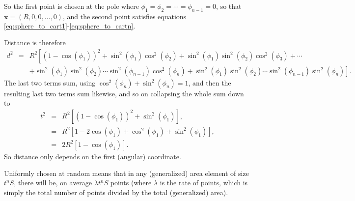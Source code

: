 So the first point is chosen at the pole where
$\phi_1=\phi_2=\cdots=\phi_{n-1}=0$, so that ${\mathbf x} =
(R,0,0,\ldots,0)$, and the second point satisfies equations
\eqref{eq:sphere_to_cart1}-\eqref{eq:sphere_to_cartn}. 

Distance is therefore
\begin{eqnarray}
  \label{eq:d_nsphere}
  d^2 & = & R^2 \left[ 
                        (1-\cos(\phi_1))^2
                       + \sin^2 (\phi_1) \cos^2 (\phi_2 )
                       + \sin^2 (\phi_1) \sin^2 (\phi_2) \cos^2 (\phi_3 )
                       + \cdots \right.  \nonumber \\
     & &   \left.           + \sin^2 (\phi_1) \sin^2 (\phi_2) \cdots \sin^2 (\phi_{n-1}) \cos^2 (\phi_{n})
                       + \sin^2 (\phi_1) \sin^2 (\phi_2) \cdots \sin^2 (\phi_{n-1}) \sin^2 (\phi_{n}) 
                 \right].
\end{eqnarray}
The last two terms sum, using $\cos^2 (\phi_{n}) + \sin^2
(\phi_{n}) = 1$, and then the resulting last two terms sum
likewise, and so on collapsing the whole sum down to
\begin{eqnarray}
  \label{eq:d_nsphere}
  t^2 & = & R^2 \left[ 
                        (1-\cos(\phi_1))^2
                       + \sin^2 (\phi_1) \right], \nonumber \\
 & = & R^2 \left[ 1 - 2 \cos(\phi_1) + \cos^2(\phi_1)
                       + \sin^2 (\phi_1) \right], \nonumber \\
 & = & 2 R^2 \left[ 1 - \cos(\phi_1) \right].
\end{eqnarray}
So distance only depends on the first (angular) coordinate.


Uniformly chosen at random means that in any (generalized) area
element of size $t^{n}S$, there will be, on average $\lambda t^{n}S$
points (where $\lambda$ is the rate of points, which is simply the
total number of points divided by the total (generalized) area).

